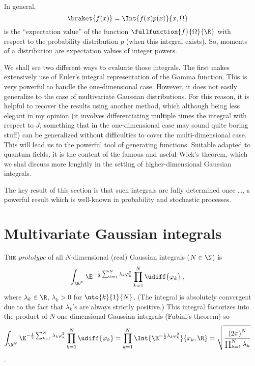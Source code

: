 In general,  
\begin{dmath*}
   \braket{f(x)} = \Int{f(x) p(x)}{x, \Omega}
\end{dmath*}
is the ``expectation value'' of the function $\fullfunction{f}{\Omega}{\R}$ with respect to the probability
distribution $p$ (when this integral exists).
So, moments of a distribution are expectation values of integer powers.


We shall see two different ways to evaluate those integrals.  The first makes
extensively use of Euler's integral representation of the Gamma function.  This
is very powerful to handle the one-dimensional case.  However, it does not
easily generalize to the case of multivariate Gaussian distributions.  For this
reason, it is helpful to recover the results using another method, which
although being less elegant in my opinion (it involves differentiating multiple times the
integral with respect to $J$, something that in the one-dimensional case may
sound quite boring stuff) can be generalized without difficulties to cover
the multi-dimensional case. This will lead us to the powerful tool of
generating functions. Suitable adapted to quantum fields, it is the content of
the famous and useful Wick's theorem, which we shal  discuss more lenghtly in
the setting of higher-dimensional Gaussian integrals.

The key result of this section is that such integrals are fully determined once
\ldots, a powerful result which is well-known in probability and stochastic
processes.


\section{Multivariate Gaussian integrals}

\lettrine{T}{he} \emph{prototype}  of all $N$-dimensional (real) Gaussian integrals
($N\in\N$) is 
\begin{equation}
   \int_{\R^{N}} \E^{ - \frac{1}{2} \sum_{k=1}^{N} \lambda_{k} \varphi_{k}^{2} }
   \prod_{k=1}^{N} \udiff{\varphi_{k}} \; ,
\end{equation}
where $\lambda_{k} \in \R$, $\lambda_{k} >0$ for $\nto{k}{1}{N}$.
(The integral is absolutely convergent due to the fact that $\lambda_{k}$'s are
always
strictly positive.)
This integral factorizes into the product of $N$ one-dimensional Gaussian
integrals (Fubini's theorem) so
\begin{dmath}[compact]
   \int_{\R^{N}} \E^{ - \frac{1}{2} \sum_{k=1}^{N} \lambda_{k} \varphi_{k}^{2} }
   \prod_{k=1}^{N} \udiff{\varphi_{k}} = \prod_{k=1}^{N} \Int{\E^{-\frac{1}{2}
	 \lambda_{k} \varphi_{k}^{2}}}{x_{k}, \R} =   \sqrt{\frac{ \left(
	    2\pi\right)^{N}}{ \prod_{k=1}^{N} \lambda_{k}}} 
\end{dmath}.

